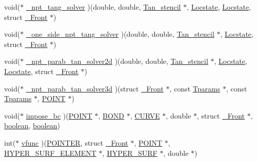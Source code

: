 \begin{DoxyCompactItemize}
\item 
void($\ast$ \hyperlink{struct___front_a093205e13f21c14a21795638d9ef89c0}{\+\_\+npt\+\_\+tang\+\_\+solver} )(double, double, \hyperlink{fdecs_8h_a1b4c755301113d81fb1da66552774669}{Tan\+\_\+stencil} $\ast$, \hyperlink{fdecs_8h_ace3c795e1cf7a6b6e5444944f0b59bcd}{Locstate}, \hyperlink{fdecs_8h_ace3c795e1cf7a6b6e5444944f0b59bcd}{Locstate}, struct \hyperlink{struct___front}{\+\_\+\+Front} $\ast$)
\item 
void($\ast$ \hyperlink{struct___front_aacf67ecc49cef8e3cc295a21a048db8a}{\+\_\+one\+\_\+side\+\_\+npt\+\_\+tang\+\_\+solver} )(double, double, \hyperlink{fdecs_8h_a1b4c755301113d81fb1da66552774669}{Tan\+\_\+stencil} $\ast$, \hyperlink{fdecs_8h_ace3c795e1cf7a6b6e5444944f0b59bcd}{Locstate}, struct \hyperlink{struct___front}{\+\_\+\+Front} $\ast$)
\item 
void($\ast$ \hyperlink{struct___front_a91636124e14bce2d1fbe1d0e370db9fb}{\+\_\+npt\+\_\+parab\+\_\+tan\+\_\+solver2d} )(double, double, \hyperlink{fdecs_8h_a1b4c755301113d81fb1da66552774669}{Tan\+\_\+stencil} $\ast$, \hyperlink{fdecs_8h_ace3c795e1cf7a6b6e5444944f0b59bcd}{Locstate}, \hyperlink{fdecs_8h_ace3c795e1cf7a6b6e5444944f0b59bcd}{Locstate}, struct \hyperlink{struct___front}{\+\_\+\+Front} $\ast$)
\item 
void($\ast$ \hyperlink{struct___front_a89179affcf68c2ebe29c353391ff72bd}{\+\_\+npt\+\_\+parab\+\_\+tan\+\_\+solver3d} )(struct \hyperlink{struct___front}{\+\_\+\+Front} $\ast$, const \hyperlink{fdecs_8h_db/dfc/struct_tparams}{Tparams} $\ast$, const \hyperlink{fdecs_8h_db/dfc/struct_tparams}{Tparams} $\ast$, \hyperlink{int_8h_a3a87c5c9d0146e30a4bf720f701e5a63}{P\+O\+I\+NT} $\ast$)
\item 
void($\ast$ \hyperlink{struct___front_af24625822acdf4f3a82097be5109abf9}{impose\+\_\+bc} )(\hyperlink{int_8h_a3a87c5c9d0146e30a4bf720f701e5a63}{P\+O\+I\+NT} $\ast$, \hyperlink{int_8h_a13b5a9ccac0e6d04386af2ef62582540}{B\+O\+ND} $\ast$, \hyperlink{int_8h_a4c1c272bef898dbaa20b055af85cd685}{C\+U\+R\+VE} $\ast$, double $\ast$, struct \hyperlink{struct___front}{\+\_\+\+Front} $\ast$, \hyperlink{cdecs_8h_ad048433382a936258fb49e2ec4f148e1}{boolean}, \hyperlink{cdecs_8h_ad048433382a936258fb49e2ec4f148e1}{boolean})
\item 
int($\ast$ \hyperlink{struct___front_a0b0ae44ea8e488ee26251aeb28874e22}{vfunc} )(\hyperlink{cdecs_8h_ae51a81000f343b8ec43bca1f6a723d7b}{P\+O\+I\+N\+T\+ER}, struct \hyperlink{struct___front}{\+\_\+\+Front} $\ast$, \hyperlink{int_8h_a3a87c5c9d0146e30a4bf720f701e5a63}{P\+O\+I\+NT} $\ast$, \hyperlink{int_8h_a17e21ae7174174d7a55516f8c9a8f12f}{H\+Y\+P\+E\+R\+\_\+\+S\+U\+R\+F\+\_\+\+E\+L\+E\+M\+E\+NT} $\ast$, \hyperlink{int_8h_acef50fa4757ce0d3f75c97fab5a175bc}{H\+Y\+P\+E\+R\+\_\+\+S\+U\+RF} $\ast$, double $\ast$)

\end{DoxyCompactItemize}
